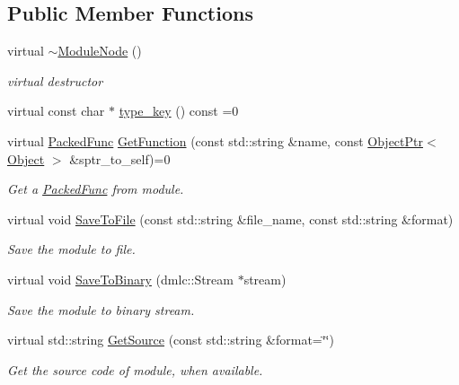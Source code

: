 \subsection*{Public Member Functions}
\begin{DoxyCompactItemize}
\item 
virtual \hyperlink{classtvm_1_1runtime_1_1ModuleNode_add6c8e6967c6906ea5346b2ccd30afb4}{$\sim$\+Module\+Node} ()
\begin{DoxyCompactList}\small\item\em virtual destructor \end{DoxyCompactList}\item 
virtual const char $\ast$ \hyperlink{classtvm_1_1runtime_1_1ModuleNode_a5834549180e1c668e7126562cea9a557}{type\+\_\+key} () const =0
\item 
virtual \hyperlink{classtvm_1_1runtime_1_1PackedFunc}{Packed\+Func} \hyperlink{classtvm_1_1runtime_1_1ModuleNode_af16bc90e6265eb5492b028308dbb1a25}{Get\+Function} (const std\+::string \&name, const \hyperlink{classtvm_1_1runtime_1_1ObjectPtr}{Object\+Ptr}$<$ \hyperlink{classtvm_1_1runtime_1_1Object}{Object} $>$ \&sptr\+\_\+to\+\_\+self)=0
\begin{DoxyCompactList}\small\item\em Get a \hyperlink{classtvm_1_1runtime_1_1PackedFunc}{Packed\+Func} from module. \end{DoxyCompactList}\item 
virtual void \hyperlink{classtvm_1_1runtime_1_1ModuleNode_ad06785ce4a9daf8602748f1b9cff5b90}{Save\+To\+File} (const std\+::string \&file\+\_\+name, const std\+::string \&format)
\begin{DoxyCompactList}\small\item\em Save the module to file. \end{DoxyCompactList}\item 
virtual void \hyperlink{classtvm_1_1runtime_1_1ModuleNode_acd613ea7faf2fc100d1e8b0fd80020c3}{Save\+To\+Binary} (dmlc\+::\+Stream $\ast$stream)
\begin{DoxyCompactList}\small\item\em Save the module to binary stream. \end{DoxyCompactList}\item 
virtual std\+::string \hyperlink{classtvm_1_1runtime_1_1ModuleNode_a73ac521892f4263554116261303e7e44}{Get\+Source} (const std\+::string \&format=\char`\"{}\char`\"{})
\begin{DoxyCompactList}\small\item\em Get the source code of module, when available. \end{DoxyCompactList}\item 

\end{DoxyCompactItemize}
